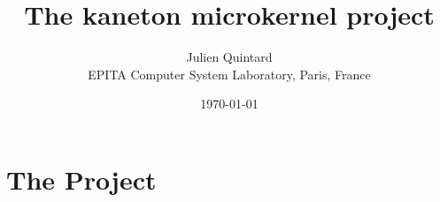 \documentclass[10pt,a4wide]{article}
\title{The kaneton microkernel project}
\author{\small{Julien Quintard} \\
        \scriptsize{EPITA Computer System Laboratory, Paris, France}}
\date{\scriptsize{\today}}
\begin{document}
\maketitle


\begin{abstract}

\end{abstract}

%
%



\section{The Project}
\end{document}
